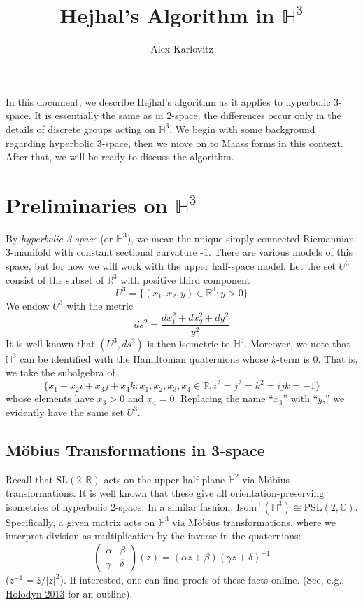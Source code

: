 \documentclass[]{article}
\title{Hejhal's Algorithm in $\mathbb{H}^3$}
\author{Alex Karlovitz}
\date{}
\begin{document}
	
	\maketitle

In this document, we describe Hejhal's algorithm as it applies to hyperbolic 3-space.
It is essentially the same as in 2-space; the differences occur only in the details of discrete groups acting on $\mathbb{H}^3$.
We begin with some background regarding hyperbolic 3-space, then we move on to Maass forms in this context.
After that, we will be ready to discuss the algorithm.

\section*{Preliminaries on $\mathbb{H}^3$}

By \textit{hyperbolic 3-space} (or $\mathbb{H}^3$), we mean the unique simply-connected Riemannian 3-manifold with constant sectional curvature -1.
There are various models of this space, but for now we will work with the upper half-space model.
Let the set $U^3$ consist of the subset of $\mathbb{R}^3$ with positive third component
$$
U^3 = \{ (x_1, x_2, y) \in \mathbb{R}^3 : y > 0 \}
$$
We endow $U^3$ with the metric
$$
ds^2 = \frac{dx_1^2 + dx_2^2 + dy^2}{y^2}
$$
It is well known that $(U^3, ds^2)$ is then isometric to $\mathbb{H}^3$.
Moreover, we note that $\mathbb{H}^3$ can be identified with the Hamiltonian quaternions whose $k$-term is 0.
That is, we take the subalgebra of
$$
\{ x_1 + x_2i + x_3j + x_4k : x_1, x_2, x_3, x_4 \in \mathbb{R}, i^2 = j^2 = k^2 = ijk = -1 \}
$$
whose elements have $x_3 > 0$ and $x_4 = 0$.
Replacing the name ``$x_3$'' with ``$y$,'' we evidently have the same set $U^3$.

\subsection*{M\"obius Transformations in 3-space}

Recall that $\text{SL}(2, \mathbb{R})$ acts on the upper half plane $\mathbb{H}^2$ via M\"obius transformations.
It is well known that these give all orientation-preserving isometries of hyperbolic 2-space.
In a similar fashion, $\text{Isom}^+(\mathbb{H}^3) \cong \text{PSL}(2, \mathbb{C})$.
Specifically, a given matrix acts on $\mathbb{H}^3$ via M\"obius transformations, where we interpret division as multiplication by the inverse in the quaternions:
$$
\begin{pmatrix}
\alpha & \beta \\
\gamma & \delta
\end{pmatrix}(z) =
(\alpha z + \beta)(\gamma z + \delta)^{-1}
$$
($z^{-1} = \bar{z}/|z|^2$).
If interested, one can find proofs of these facts online. (See, e.g., \href{http://www.maths.qmul.ac.uk/~sb/LTCCcourse/Holodyn2013notes_week3.pdf}{Holodyn 2013} for an outline).
\end{document}
